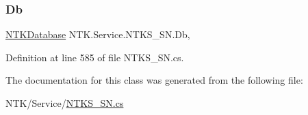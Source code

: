 \subsubsection{\texorpdfstring{Db}{Db}}
{\footnotesize\ttfamily \mbox{\hyperlink{class_n_t_k_1_1_database_1_1_n_t_k_database}{N\+T\+K\+Database}} N\+T\+K.\+Service.\+N\+T\+K\+S\+\_\+\+S\+N.\+Db\hspace{0.3cm}{\ttfamily [get]}, {\ttfamily [set]}}







Definition at line 585 of file N\+T\+K\+S\+\_\+\+S\+N.\+cs.



The documentation for this class was generated from the following file\+:\begin{DoxyCompactItemize}
\item 
N\+T\+K/\+Service/\mbox{\hyperlink{_n_t_k_s___s_n_8cs}{N\+T\+K\+S\+\_\+\+S\+N.\+cs}}\end{DoxyCompactItemize}

